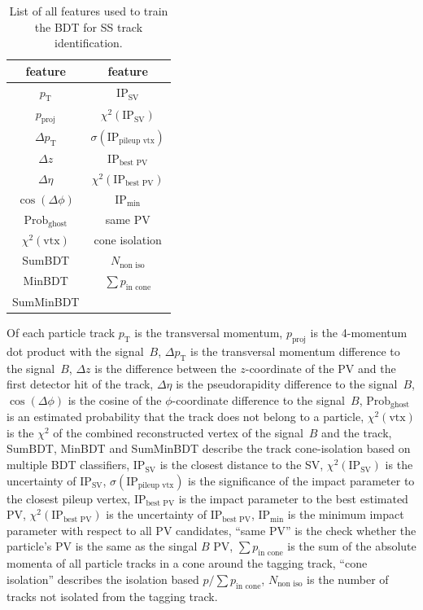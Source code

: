 \begin{table}
    \centering
    \caption{List of all features used to train the BDT for SS track identification.}
    \label{tab:SS_features}
    \begin{tabular}{c c}
        \toprule
        feature & feature \\
        \midrule
        $p_\text{T}$        & $\text{IP}_\text{SV}$ \\ 
        $p_\text{proj}$     & $\chi^2(\text{IP}_\text{SV})$ \\ 
        $\Delta p_\text{T}$ & $\sigma(\text{IP}_\text{pileup vtx})$ \\ 
        $\Delta z$          & $\text{IP}_\text{best PV}$ \\    
        $\Delta \eta$       & $\chi^2(\text{IP}_\text{best PV})$ \\ 
        $\cos(\Delta \phi)$ & $\text{IP}_\text{min}$ \\ 
        $\text{Prob}_\text{ghost}$ & same PV \\
        $\chi^2(\text{vtx})$     & cone isolation \\
        SumBDT              & $N_\text{non iso}$ \\ 
        MinBDT              & $\sum p_\text{in cone}$ \\ 
        SumMinBDT           &  \\
        \bottomrule
    \end{tabular}
\end{table}

Of each particle track %
$p_\text{T}$ is the transversal momentum, 
$p_\text{proj}$ is the 4-momentum dot product with the signal~$B$,
$\Delta p_\text{T}$ is the transversal momentum difference to the signal~$B$,
$\Delta z$ is the difference between the $z$-coordinate of the PV and the first detector hit of the track,        
$\Delta \eta$ is the pseudorapidity difference to the signal~$B$,     
$\cos(\Delta \phi)$ is the cosine of the $\phi$-coordinate difference to the signal~$B$, 
$\text{Prob}_\text{ghost}$ is an estimated probability that the track does not belong to a particle, %
$\chi^2(\text{vtx})$ is the $\chi^2$ of the combined reconstructed vertex of the signal~$B$ and the track, 
SumBDT,    
MinBDT and    
SumMinBDT describe the track cone-isolation based on multiple BDT classifiers,
$\text{IP}_\text{SV}$ is the closest distance to the SV, 
$\chi^2(\text{IP}_\text{SV})$ is the uncertainty of $\text{IP}_\text{SV}$,
$\sigma(\text{IP}_\text{pileup vtx})$ is the significance of the impact parameter to the closest pileup vertex,
$\text{IP}_\text{best PV}$ is the impact parameter to the best estimated PV, 
$\chi^2(\text{IP}_\text{best PV})$ is the uncertainty of $\text{IP}_\text{best PV}$,
$\text{IP}_\text{min}$ is the minimum impact parameter with respect to all PV candidates,
\enquote{same PV} is the check whether the particle's PV is the same as the singal $B$ PV,
$\sum p_\text{in cone}$ is the sum of the absolute momenta of all particle tracks in a cone around the tagging track,
\enquote{cone isolation} describes the isolation based $p/\sum p_\text{in cone}$, 
$N_\text{non iso}$ is the number of tracks not isolated from the tagging track.   

